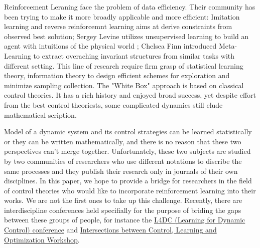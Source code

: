 \documentclass[journal]{IEEEtran}
\begin{document}
Reinforcement Leraning face the problem of data efficiency. Their community has been trying to make it more broadly applicable and more efficient: Imitation learning and reverse reinforcemnt learning \cite{Ho2016GenerativeAI} aims at derive constraints from observed best solution; Sergey Levine utilizes unsupervised learning to build an agent with intuitions of the physical world \cite{Finn2016UnsupervisedLF}; Chelsea Finn introduced Meta-Learning \cite{Finn2017ModelAgnosticMF} to extract overaching invariant structures from similar tasks with different setting. This line of research require firm grasp of statistical learning theory, information theory to design efficient schemes for exploration and minimize sampling collection. The "White Box" approach is based on classical control theories. It has a rich history and enjoyed broad success, yet despite effort from the best control theoriests, some complicated dynamics still elude mathematical scription.

Model of a dynamic system and its control strategies can be learned statistically or they can be written mathematically, and there is no reason that these two perspectives can't merge together. Unfortunately, these two subjects are studied by two communities of researchers who use different notations to discribe the same processes and they publish their research only in journals of their own disciplines. In this paper, we hope to provide a bridge for researchers in the field of control theories who would like to incorporate reinforcement learning into their works. We are not the first ones to take up this challenge. Recently, there are interdiscipline conferences held specifially for the purpose of briding the gaps between these groups of people, for instance the \href{https://l4dc.mit.edu/}{L4DC (Learning for Dynamic Control) conference} and \href{https://www.ipam.ucla.edu/programs/workshops/intersections-between-control-learning-and-optimization/}{Intersections between Control, Learning and Optimization Workshop}.
\end{document}
